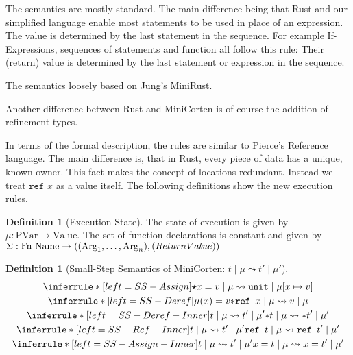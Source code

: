 \documentclass{article}
\newcommand{\code}[1]{\texttt{#1}}
\theoremstyle{definition}
\newtheorem{definition}[theorem]{Definition}
\begin{document}
The semantics are mostly standard. The main difference being that Rust and our simplified language enable most statements to be used in place of an expression. The value is determined by the last statement in the sequence. For example If-Expressions, sequences of statements and function all follow this rule: Their (return) value is determined by the last statement or expression in the sequence.

The semantics loosely based on Jung's MiniRust.

Another difference between Rust and MiniCorten is of course the addition of refinement types. 

In terms of the formal description, the rules are similar to Pierce's \cite[p. 166f]{pierce_types_2002-3} Reference language. The main difference is, that in Rust, every piece of data has a unique, known owner. This fact makes the concept of locations redundant. Instead we treat $\code{ref } x$ as a value itself. The following definitions show the new execution rules.

\begin{definition}[Execution-State]
  The state of execution is given by $\mu : \text{PVar} \to \text{Value}$. The set of function declarations is constant and given by $\Sigma : \text{Fn-Name} \to ((\text{Arg}_1, \dots, \text{Arg}_n), \text(ReturnValue))$
\end{definition}

\begin{definition}[Small-Step Semantics of MiniCorten: $t \mid \mu \leadsto t' \mid \mu'$]


\begin{gather*}
  \inferrule*[left=SS-Assign]
    {\star}
    {x = v \mid \mu \leadsto \code{unit} \mid \mu[x \mapsto v]}
  \\
  \inferrule*[left=SS-Deref]
    {\mu(x) = v}
    {* \code{ref } x \mid \mu \leadsto v \mid \mu}
  \\
  \inferrule*[left=SS-Deref-Inner]
    {t \mid \mu \leadsto t' \mid \mu'}
    {* t \mid \mu \leadsto * t' \mid \mu'}
  \\
  \inferrule*[left=SS-Ref-Inner]
      {t \mid \mu \leadsto t' \mid \mu'}
      {\code{ref } t \mid \mu \leadsto \code{ref } t' \mid \mu'}
  \\
  \inferrule*[left=SS-Assign-Inner]
      {t \mid \mu \leadsto t' \mid \mu'}
      {x = t \mid \mu \leadsto x = t' \mid \mu'}
\end{gather*}

\end{definition}
\end{document}
